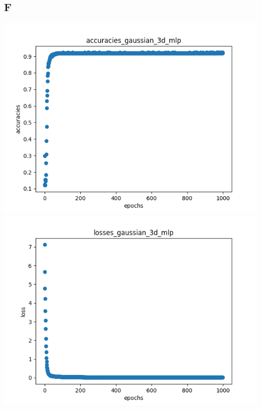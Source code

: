 \documentclass{article}
\begin{document}
\subsection{F}
\graphicspath{{../figs/}} 
\includegraphics{accuracies_gaussian_3d_mlp.png} \\
\includegraphics{losses_gaussian_3d_mlp.png}

\newpage
\end{document}
